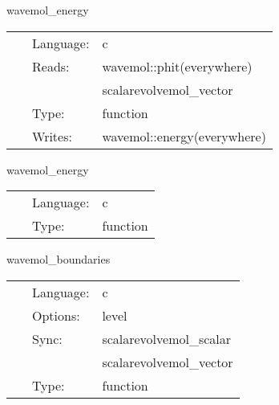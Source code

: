 \vspace{5mm}


\hspace{5mm} wavemol\_energy 

\hspace{5mm}{\it calculate the energy } 


\hspace{5mm}

 \begin{tabular*}{160mm}{cll} 
~ & Language:  & c \\ 
~ & Reads:  & wavemol::phit(everywhere) \\ 
~& ~ &scalarevolvemol\_vector\\ 
~ & Type:  & function \\ 
~ & Writes:  & wavemol::energy(everywhere) \\ 
\end{tabular*} 


\vspace{5mm}


\hspace{5mm} wavemol\_energy 

\hspace{5mm}{\it calculate the energy } 


\hspace{5mm}

 \begin{tabular*}{160mm}{cll} 
~ & Language:  & c \\ 
~ & Type:  & function \\ 
\end{tabular*} 


\vspace{5mm}


\hspace{5mm} wavemol\_boundaries 

\hspace{5mm}{\it register boundary enforcement in mol } 


\hspace{5mm}

 \begin{tabular*}{160mm}{cll} 
~ & Language:  & c \\ 
~ & Options:  & level \\ 
~ & Sync:  & scalarevolvemol\_scalar \\ 
~& ~ &scalarevolvemol\_vector\\ 
~ & Type:  & function \\ 
\end{tabular*} 


